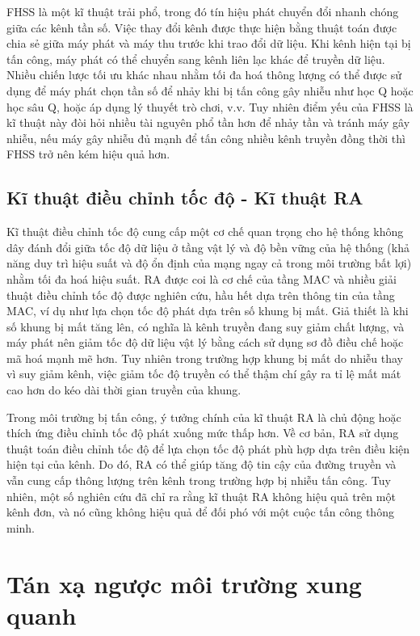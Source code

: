\documentclass{uetgraduation}
\begin{document}
FHSS là một kĩ thuật trải phổ, trong đó tín hiệu phát chuyển đổi nhanh chóng giữa các kênh tần số. Việc thay đổi kênh được thực hiện bằng thuật toán được chia sẻ giữa
máy phát và máy thu trước khi trao đổi dữ liệu. Khi kênh hiện tại bị tấn công, máy phát có thể chuyển sang kênh liên lạc khác để truyền dữ liệu. Nhiều chiến lược tối
ưu khác nhau nhằm tối đa hoá thông lượng có thể được sử dụng để máy phát chọn tần số để nhảy khi bị tấn công gây nhiễu như học Q hoặc học sâu Q, hoặc áp dụng lý thuyết
trò chơi, v.v. Tuy nhiên điểm yếu của FHSS là kĩ thuật này đòi hỏi nhiều tài nguyên phổ tần hơn để nhảy tần và tránh máy gây nhiễu, nếu máy gây nhiễu đủ mạnh để tấn công
nhiều kênh truyền đồng thời thì FHSS trở nên kém hiệu quả hơn.

\subsection{Kĩ thuật điều chỉnh tốc độ - Kĩ thuật RA}
Kĩ thuật điều chỉnh tốc độ cung cấp một cơ chế quan trọng cho hệ thống không dây đánh đổi giữa tốc độ dữ liệu ở tầng vật lý và độ bền vững của hệ thống (khả năng duy
trì hiệu suất và độ ổn định của mạng ngay cả trong môi trường bất lợi) nhằm tối đa hoá hiệu suất. RA được coi là cơ chế của tầng MAC và nhiều giải thuật điều chỉnh
tốc độ được nghiên cứu, hầu hết dựa trên thông tin của tầng MAC, ví dụ như lựa chọn tốc độ phát dựa trên số khung bị mất. Giả thiết là khi số khung bị mất tăng lên,
có nghĩa là kênh truyền đang suy giảm chất lượng, và máy phát nên giảm tốc độ dữ liệu vật lý bằng cách sử dụng sơ đồ điều chế hoặc mã hoá mạnh mẽ hơn. Tuy nhiên trong
trường hợp khung bị mất do nhiễu thay vì suy giảm kênh, việc giảm tốc độ truyền có thể thậm chí gây ra tỉ lệ mất mát cao hơn do kéo dài thời gian truyền của khung.

Trong môi trường bị tấn công, ý tưởng chính của kĩ thuật RA là chủ động hoặc thích ứng điều chỉnh tốc độ phát xuống mức thấp hơn. Về cơ bản, RA sử dụng thuật toán điều 
chỉnh tốc độ để lựa chọn tốc độ phát phù hợp dựa trên điều kiện hiện tại của kênh. Do đó, RA có thể giúp tăng độ tin cậy của đường truyền và vẫn cung cấp thông lượng 
trên kênh trong trường hợp bị nhiễu tấn công. Tuy nhiên, một số nghiên cứu đã chỉ ra rằng kĩ thuật RA không hiệu quả trên một kênh đơn, và nó cũng không hiệu
quả để đối phó với một cuộc tấn công thông minh.

\section{Tán xạ ngược môi trường xung quanh}
\end{document}

